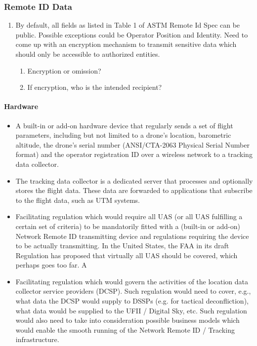 \documentclass{ua_wgs_base}
\begin{document}
\subsubsection{Remote ID Data}
\begin{enumerate}
\item By default, all fields as listed in Table 1 of ASTM Remote Id Spec
can be public. Possible exceptions could be Operator Position and
Identity. Need to come up with an encryption mechanism to transmit
sensitive data which should only be accessible to authorized entities. 
\begin{enumerate}
\item Encryption or omission?
\item If encryption, who is the intended recipient?
\end{enumerate}
\end{enumerate}


\paragraph{Hardware}
\begin{itemize}
\item A built-in or add-on hardware device that regularly sends a set of
flight parameters, including but not limited to a drone\textquoteright s
location, barometric altitude, the drone\textquoteright s serial number
(ANSI/CTA-2063 Physical Serial Number format) and the operator registration
ID over a wireless network to a tracking data collector.
\item The tracking data collector is a dedicated server that processes and
optionally stores the flight data. These data are forwarded to applications
that subscribe to the flight data, such as UTM systems.
\item Facilitating regulation which would require all UAS (or all UAS fulfilling
a certain set of criteria) to be mandatorily fitted with a (built-in
or add-on) Network Remote ID transmitting device and regulations requiring
the device to be actually transmitting. In the United States, the
FAA in its draft Regulation has proposed that virtually all UAS should
be covered, which perhaps goes too far. A
\item Facilitating regulation which would govern the activities of the location
data collector service providers (DCSP). Such regulation would need
to cover, e.g., what data the DCSP would supply to DSSPs (e.g. for
tactical deconfliction), what data would be supplied to the UFII /
Digital Sky, etc. Such regulation would also need to take into consideration
possible business models which would enable the smooth running of
the Network Remote ID / Tracking infrastructure. 
\end{itemize}
\end{document}
